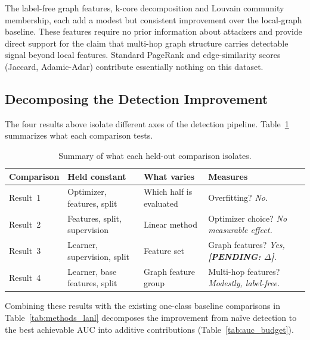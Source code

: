 The label-free graph features, k-core decomposition and Louvain community membership, each add a modest but consistent improvement over the local-graph baseline. These features require no prior information about attackers and provide direct support for the claim that multi-hop graph structure carries detectable signal beyond local features. Standard PageRank and edge-similarity scores (Jaccard, Adamic-Adar) contribute essentially nothing on this dataset.


\subsection{Decomposing the Detection Improvement}
\label{sec:weight_synthesis}

The four results above isolate different axes of the detection pipeline. Table~\ref{tab:synthesis_axes} summarizes what each comparison tests.

\begin{table}[h]
\centering
\begin{tabular}{lp{2.2cm}p{2.0cm}p{2.2cm}}
\hline
Comparison & Held constant & What varies & Measures \\
\hline
Result~1 & Optimizer, features, split & Which half is evaluated & Overfitting? \emph{No.} \\
Result~2 & Features, split, supervision & Linear method & Optimizer choice? \emph{No measurable effect.} \\
Result~3 & Learner, supervision, split & Feature set & Graph features? \emph{Yes, \textbf{[PENDING: $\Delta$]}.} \\
Result~4 & Learner, base features, split & Graph feature group & Multi-hop features? \emph{Modestly, label-free.} \\
\hline
\end{tabular}
\caption{Summary of what each held-out comparison isolates.}
\label{tab:synthesis_axes}
\end{table}

Combining these results with the existing one-class baseline comparisons in Table~\ref{tab:methods_lanl} decomposes the improvement from na\"ive detection to the best achievable AUC into additive contributions (Table~\ref{tab:auc_budget}).

